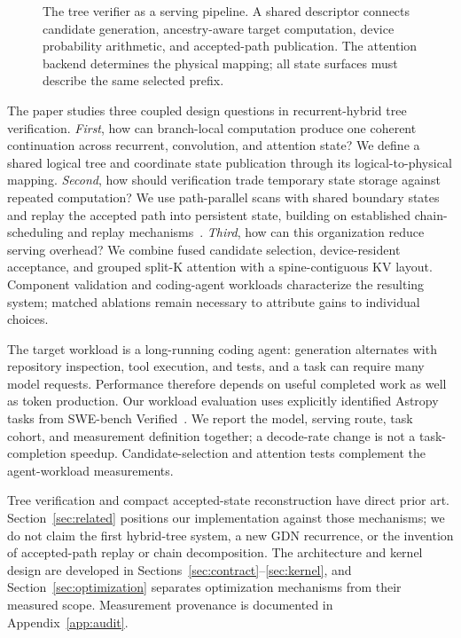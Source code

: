 \documentclass[conference]{IEEEtran}
\begin{document}
\begin{figure}[t]
\centering

\caption{The tree verifier as a serving pipeline. A shared descriptor connects candidate generation, ancestry-aware target computation, device probability arithmetic, and accepted-path publication. The attention backend determines the physical mapping; all state surfaces must describe the same selected prefix.}
\label{fig:pipeline}
\end{figure}

The paper studies three coupled design questions in recurrent-hybrid tree verification. \textit{First}, how can branch-local computation produce one coherent continuation across recurrent, convolution, and attention state? We define a shared logical tree and coordinate state publication through its logical-to-physical mapping. \textit{Second}, how should verification trade temporary state storage against repeated computation? We use path-parallel scans with shared boundary states and replay the accepted path into persistent state, building on established chain-scheduling and replay mechanisms~\cite{wang2026specla,oda2026marginals}. \textit{Third}, how can this organization reduce serving overhead? We combine fused candidate selection, device-resident acceptance, and grouped split-K attention with a spine-contiguous KV layout. Component validation and coding-agent workloads characterize the resulting system; matched ablations remain necessary to attribute gains to individual choices.

The target workload is a long-running coding agent: generation alternates with repository inspection, tool execution, and tests, and a task can require many model requests. Performance therefore depends on useful completed work as well as token production. Our workload evaluation uses explicitly identified Astropy tasks from SWE-bench Verified~\cite{jimenez2024swe}. We report the model, serving route, task cohort, and measurement definition together; a decode-rate change is not a task-completion speedup. Candidate-selection and attention tests complement the agent-workload measurements.

Tree verification and compact accepted-state reconstruction have direct prior art. Section~\ref{sec:related} positions our implementation against those mechanisms; we do not claim the first hybrid-tree system, a new GDN recurrence, or the invention of accepted-path replay or chain decomposition. The architecture and kernel design are developed in Sections~\ref{sec:contract}--\ref{sec:kernel}, and Section~\ref{sec:optimization} separates optimization mechanisms from their measured scope. Measurement provenance is documented in Appendix~\ref{app:audit}.
\end{document}
